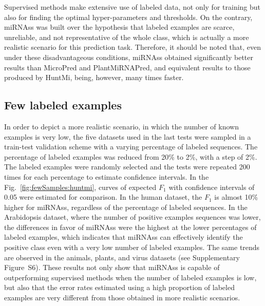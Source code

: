 \documentclass{article}
\begin{document}
Supervised methods make extensive use of labeled data, not only for training but also for finding the optimal hyper-parameters and thresholds. On the contrary, miRNAss was built over the hypothesis that labeled examples are scarce, unreliable, and not representative of the whole class, which is actually a more realistic scenario for this prediction task. Therefore, it should be noted that, even under these disadvantageous conditions, miRNAss obtained significantly better results than MicroPred and PlantMiRNAPred, and equivalent results to those produced by HuntMi, being, however, many times faster.

\subsection{Few labeled examples}
In order to depict a more realistic scenario, in which the number of known examples is very low, the five datasets used in the last tests were sampled in a train-test validation scheme with a varying percentage of labeled sequences. The percentage of labeled examples was reduced from 20\% to 2\%, with a step of 2\%. The labeled examples were randomly selected and the tests were repeated 200 times for each percentage to estimate confidence intervals. In the Fig.~\ref{fig:fewSamples:huntmi}, curves of expected $F_{1}$ with confidence intervals of 0.05 were estimated for comparison. In the human dataset, the $F_{1}$ is almost 10\% higher for miRNAss, regardless of the percentage of labeled sequences. In the Arabidopsis dataset, where the number of positive examples sequences was lower, the differences in favor of miRNAss were the highest at the lower percentages of labeled examples, which indicates that miRNAss can effectively identify the positive class even  with a very low number of labeled examples. The same trends are observed in the animals, plants, and virus datasets (see Supplementary Figure~S6).
These results not only show that miRNAss is capable of outperforming supervised methods when the number of labeled examples is low, but also that the error rates estimated using a high proportion of labeled examples are very different from those obtained in more realistic scenarios.
\end{document}
